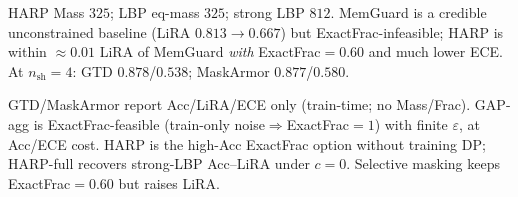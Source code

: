 \documentclass[conference]{IEEEtran}
\begin{document}
\begin{table}[!t]
\caption{Cora GraphSAGE under ExactFrac$\ge c{=}0.60$ (5 seeds; LiRA $n_{\mathrm{sh}}{=}16$).
Feasible under $c{>}0$: none, GAP-agg, HARP.
$^\dagger$GAP-inspired agg.\ Laplace (analytical $\varepsilon$; not full GAP code).
$^\S$Shadow-fit MemGuard; $\phi$ $=$ attack it optimizes.
$^\P$HARP Frac${=}1$ recovers strong-LBP Acc--LiRA.}
\label{tab:fair}
\centering
{}
\end{table}
{\scriptsize HARP Mass $325$; LBP eq-mass $325$; strong LBP $812$. MemGuard is a credible unconstrained baseline (LiRA $0.813\rightarrow 0.667$) but ExactFrac-infeasible; HARP is within ${\approx}0.01$ LiRA of MemGuard \emph{with} ExactFrac${=}0.60$ and much lower ECE. At $n_{\mathrm{sh}}{=}4$: GTD $0.878$/$0.538$; MaskArmor $0.877$/$0.580$.}

GTD/MaskArmor report Acc/LiRA/ECE only (train-time; no Mass/Frac).
GAP-agg is ExactFrac-feasible (train-only noise$\Rightarrow$ExactFrac${=}1$) with finite $\varepsilon$, at Acc/ECE cost.
HARP is the high-Acc ExactFrac option without training DP; HARP-full recovers strong-LBP Acc--LiRA under $c{=}0$.
Selective masking keeps ExactFrac$=0.60$ but raises LiRA.
\end{document}
